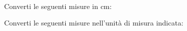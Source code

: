 \documentclass[12pt]{exam}
\begin{document}
\begin{questions}
\begin{multicols}{2}
\begin{parts}
    ~
\end{parts}
\end{multicols}
\addpoints


\question Converti le seguenti misure in cm:
\noaddpoints %
\begin{multicols}{2}
\end{multicols}
\addpoints

\question Converti le seguenti misure nell'unità di misura indicata:
\noaddpoints %
\begin{multicols}{2}
\end{multicols}
\end{questions}
\end{document}
